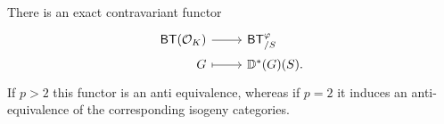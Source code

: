\begin{prop}\label{prop:A6Kisin}
	There is an exact contravariant functor
	\begin{equation*}
	\begin{tikzcd}[row sep = 0ex
		,/tikz/column 1/.append style={anchor=base east}
		,/tikz/column 2/.append style={anchor=base west}]
		\mathsf{BT}(\mathcal{O}_{ K }) \arrow[r, "", rightarrow] &
		\mathsf{BT}^{\varphi}_{/S} \\
		G \arrow[r, "", mapsto] & 
		\mathbb{D}^*(G)(S)
	.\end{tikzcd}
	\end{equation*} 
	If $p > 2$ this functor is an anti equivalence,
	whereas if $p = 2$ it induces an anti-equivalence of the 
	corresponding isogeny categories.
\end{prop}
